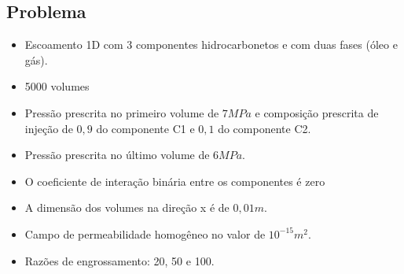 \documentclass[professionalfont]{beamer}
\begin{document}
\subsection{Problema \theproblem}

\begin{frame}{\FrameProblemName}
    \begin{itemize}
        \item Escoamento 1D com 3 componentes hidrocarbonetos e com duas fases (óleo e gás). 
        \item 5000 volumes 
        \item Pressão prescrita no primeiro volume de $7MPa$ e composição prescrita de injeção de $0,9$ do componente C1 e $0,1$ do componente C2. 
        \item Pressão prescrita no último volume de $6MPa$. 
        \item O coeficiente de interação binária entre os componentes é zero 
        \item A dimensão dos volumes na direção x é de $0,01m$. 
        \item Campo de permeabilidade homogêneo no valor de $10^{-15} m^{2}$.
        \item Razões de engrossamento: 20, 50 e 100.
    \end{itemize}
\end{frame}
\end{document}
